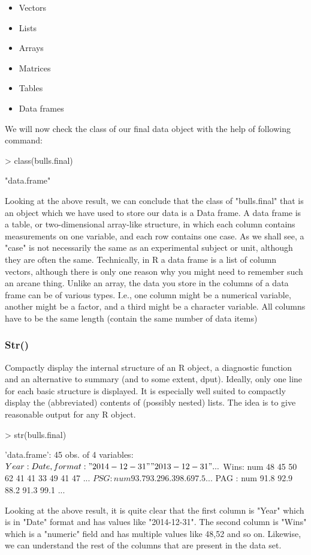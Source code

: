 \documentclass[a4paper]{article}
\begin{document}
\begin{itemize}
\item Vectors
\item Lists
\item Arrays
\item Matrices
\item Tables
\item Data frames
\end{itemize}

We will now check the class of our final data object with the help of following command:

\begin{Schunk}
\begin{Sinput}
> class(bulls.final)
\end{Sinput}
\begin{Soutput}
[1] "data.frame"
\end{Soutput}
\end{Schunk}
Looking at the above result, we can conclude that the class of "bulls.final" that is an object which we have used to store our data is a Data frame.
  A data frame is a table, or two-dimensional array-like structure, in which each column contains measurements on one variable, and each row contains one case. As we shall see, a "case" is not necessarily the same as an experimental subject or unit, although they are often the same. Technically, in R a data frame is a list of column vectors, although there is only one reason why you might need to remember such an arcane thing. Unlike an array, the data you store in the columns of a data frame can be of various types. I.e., one column might be a numerical variable, another might be a factor, and a third might be a character variable. All columns have to be the same length (contain the same number of data items)

\subsubsection{Str()}
Compactly display the internal structure of an R object, a diagnostic function and an alternative to summary (and to some extent, dput). Ideally, only one line for each basic structure is displayed. It is especially well suited to compactly display the (abbreviated) contents of (possibly nested) lists. The idea is to give reasonable output for any R object. 
\begin{Schunk}
\begin{Sinput}
> str(bulls.final)
\end{Sinput}
\begin{Soutput}
'data.frame':	45 obs. of  4 variables:
 $ Year: Date, format: "2014-12-31" "2013-12-31" ...
 $ Wins: num  48 45 50 62 41 41 33 49 41 47 ...
 $ PSG : num  93.7 93.2 96.3 98.6 97.5 ...
 $ PAG : num  91.8 92.9 88.2 91.3 99.1 ...
\end{Soutput}
\end{Schunk}
Looking at the above result, it is quite clear that the first column is "Year" which is in "Date" format and has values like "2014-12-31".
  The second column is "Wins" which is a "numeric" field and has multiple values like 48,52 and so on.
  Likewise, we can understand the rest of the columns that are present in the data set.
\end{document}
